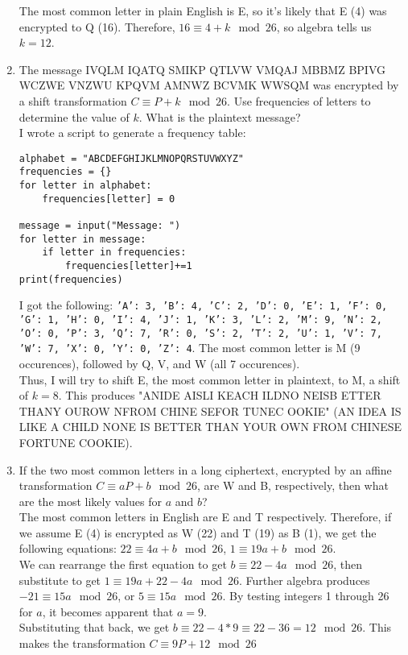 \documentclass{article}
\begin{document}
\begin{enumerate}
          The most common letter in plain English is E, so it's likely that E (4) was encrypted to Q (16). Therefore, $16 \equiv 4 + k \mod{26}$, so algebra tells us $k = 12$.
    \item The message IVQLM IQATQ SMIKP QTLVW VMQAJ MBBMZ BPIVG WCZWE VNZWU KPQVM AMNWZ BCVMK WWSQM was encrypted by a shift transformation $C \equiv P + k \mod{26}$. Use frequencies of letters to determine the value of $k$. What is the plaintext message?\\
          I wrote a script to generate a frequency table:
          \begin{verbatim}
alphabet = "ABCDEFGHIJKLMNOPQRSTUVWXYZ"
frequencies = {}
for letter in alphabet:
    frequencies[letter] = 0

message = input("Message: ")
for letter in message:
    if letter in frequencies:
        frequencies[letter]+=1
print(frequencies)
          \end{verbatim}
          I got the following: \texttt{'A': 3, 'B': 4, 'C': 2, 'D': 0, 'E': 1, 'F': 0, 'G': 1, 'H': 0, 'I': 4, 'J': 1, 'K': 3, 'L': 2, 'M': 9, 'N': 2, 'O': 0, 'P': 3, 'Q': 7, 'R': 0, 'S': 2, 'T': 2, 'U': 1, 'V': 7, 'W': 7, 'X': 0, 'Y': 0, 'Z': 4}. The most common letter is M (9 occurences), followed by Q, V, and W (all 7 occurences).\\
          Thus, I will try to shift E, the most common letter in plaintext, to M, a shift of $k = 8$. This produces "ANIDE AISLI KEACH ILDNO NEISB ETTER THANY OUROW NFROM CHINE SEFOR TUNEC OOKIE" (AN IDEA IS LIKE A CHILD NONE IS BETTER THAN YOUR OWN FROM CHINESE FORTUNE COOKIE).
    \item If the two most common letters in a long ciphertext, encrypted by an affine transformation $C \equiv aP + b \mod{26}$, are W and B, respectively, then what are the most likely values for $a$ and $b$?\\
          The most common letters in English are E and T respectively. Therefore, if we assume E (4) is encrypted as W (22) and T (19) as B (1), we get the following equations: $22 \equiv 4a + b \mod{26}$, $1 \equiv 19a + b \mod{26}$.\\
          We can rearrange the first equation to get $b \equiv 22 - 4a \mod{26}$, then substitute to get $1 \equiv 19a + 22 - 4a \mod{26}$. Further algebra produces $-21 \equiv 15a \mod{26}$, or $5 \equiv 15a \mod{26}$. By testing integers 1 through 26 for $a$, it becomes apparent that $a = 9$.\\
          Substituting that back, we get $b \equiv 22 - 4*9 \equiv 22 - 36 = 12 \mod{26}$. This makes the transformation $C \equiv 9P + 12 \mod{26}$\\

\end{enumerate}
\end{document}
